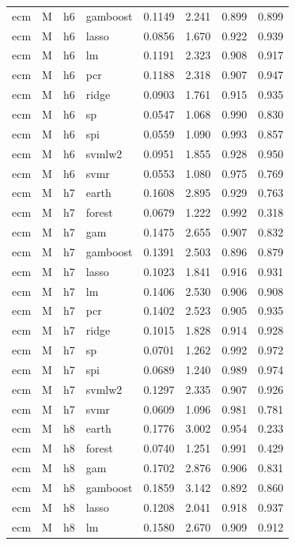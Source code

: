 \begin{ThreePartTable}
\begin{longtable}[t]{llclcccc}
ecm & M & h6 & gamboost & 0.1149 & 2.241 & 0.899 & 0.899\\
ecm & M & h6 & lasso & 0.0856 & 1.670 & 0.922 & 0.939\\
ecm & M & h6 & lm & 0.1191 & 2.323 & 0.908 & 0.917\\
ecm & M & h6 & pcr & 0.1188 & 2.318 & 0.907 & 0.947\\
ecm & M & h6 & ridge & 0.0903 & 1.761 & 0.915 & 0.935\\
ecm & M & h6 & sp & 0.0547 & 1.068 & 0.990 & 0.830\\
ecm & M & h6 & spi & 0.0559 & 1.090 & 0.993 & 0.857\\
ecm & M & h6 & svmlw2 & 0.0951 & 1.855 & 0.928 & 0.950\\
ecm & M & h6 & svmr & 0.0553 & 1.080 & 0.975 & 0.769\\
\addlinespace
ecm & M & h7 & earth & 0.1608 & 2.895 & 0.929 & 0.763\\
ecm & M & h7 & forest & 0.0679 & 1.222 & 0.992 & 0.318\\
ecm & M & h7 & gam & 0.1475 & 2.655 & 0.907 & 0.832\\
ecm & M & h7 & gamboost & 0.1391 & 2.503 & 0.896 & 0.879\\
ecm & M & h7 & lasso & 0.1023 & 1.841 & 0.916 & 0.931\\
ecm & M & h7 & lm & 0.1406 & 2.530 & 0.906 & 0.908\\
ecm & M & h7 & pcr & 0.1402 & 2.523 & 0.905 & 0.935\\
ecm & M & h7 & ridge & 0.1015 & 1.828 & 0.914 & 0.928\\
ecm & M & h7 & sp & 0.0701 & 1.262 & 0.992 & 0.972\\
ecm & M & h7 & spi & 0.0689 & 1.240 & 0.989 & 0.974\\
ecm & M & h7 & svmlw2 & 0.1297 & 2.335 & 0.907 & 0.926\\
ecm & M & h7 & svmr & 0.0609 & 1.096 & 0.981 & 0.781\\
\addlinespace
ecm & M & h8 & earth & 0.1776 & 3.002 & 0.954 & 0.233\\
ecm & M & h8 & forest & 0.0740 & 1.251 & 0.991 & 0.429\\
ecm & M & h8 & gam & 0.1702 & 2.876 & 0.906 & 0.831\\
ecm & M & h8 & gamboost & 0.1859 & 3.142 & 0.892 & 0.860\\
ecm & M & h8 & lasso & 0.1208 & 2.041 & 0.918 & 0.937\\
ecm & M & h8 & lm & 0.1580 & 2.670 & 0.909 & 0.912\\

\end{longtable}
\end{ThreePartTable}
